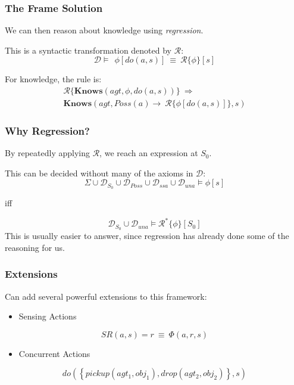 \documentclass{beamer}
\begin{document}
\begin{frame}
\frametitle{The Frame Solution}
We can then reason about knowledge using \emph{regression}.

This is a syntactic transformation denoted by $\mathcal{R}$:
\begin{equation*}
\mathcal{D} \models\ \ \phi[do(a,s)]\ \equiv\ \mathcal{R}\{\phi\}[s]
\end{equation*}

\pause
For knowledge, the rule is:
\begin{multline*}
  \mathcal{R}\{\mathbf{Knows}(agt,\phi,do(a,s))\}\ \Rightarrow\ \\
    \mathbf{Knows}(agt,Poss(a) \rightarrow\ \mathcal{R}\{\phi[do(a,s)]\},s)
\end{multline*}
\end{frame}

\begin{frame}
\frametitle{Why Regression?}
By repeatedly applying $\mathcal{R}$, we reach an expression at $S_0$.

This can be decided without many of the axioms in $\mathcal{D}$:
\begin{equation*}
  \Sigma \cup \mathcal{D}_{S_0} \cup \mathcal{D}_{Poss} \cup \mathcal{D}_{ssa} \cup \mathcal{D}_{una} \models \phi[s]
\end{equation*}
\begin{center}
iff
\end{center}
\begin{equation*}
  \mathcal{D}_{S_0} \cup \mathcal{D}_{una} \models \mathcal{R}^{*}\{\phi\}[S_0]
\end{equation*}
This is usually easier to answer, since regression has already done some
of the reasoning for us.
\end{frame}

\begin{frame}
\frametitle{Extensions}
Can add several powerful extensions to this framework:

\begin{itemize}
\item Sensing Actions
\end{itemize}
\begin{equation*}
SR(a,s)=r\ \equiv\ \Phi(a,r,s)
\end{equation*}

\begin{itemize}
\item Concurrent Actions
\end{itemize}
\begin{equation*}
  do(\left\{pickup(agt_1,obj_1),drop(agt_2,obj_2)\right\},s)
\end{equation*}
\end{frame}
\end{document}
